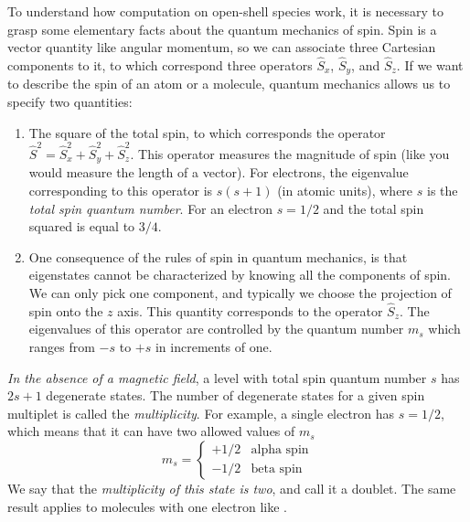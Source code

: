 \documentclass[../Main/notes.tex]{subfiles}
\begin{document}
To understand how computation on open-shell species work, it is necessary to grasp some elementary facts about the quantum mechanics of spin.
Spin is a vector quantity like angular momentum, so we can associate three Cartesian components to it, to which correspond three operators $\hat{S}_x$, $\hat{S}_y$, and $\hat{S}_z$.
If we want to describe the spin of an atom or a molecule, quantum mechanics allows us to specify two quantities:
\begin{enumerate}
\item The square of the total spin, to which corresponds the operator $\hat{S}^2 = \hat{S}_x^2 + \hat{S}_y^2 + \hat{S}_z^2$.
This operator measures the magnitude of spin (like you would measure the length of a vector).
For electrons, the eigenvalue corresponding to this operator is $s(s + 1)$ (in atomic units), where $s$ is the \emph{total spin quantum number}.
For an electron $s = 1/2$ and the total spin squared is equal to $3/4$.

\item One consequence of the rules of spin in quantum mechanics, is that eigenstates cannot be characterized by knowing all the components of spin.
We can only pick one component, and typically we choose the projection of spin onto the $z$ axis. This quantity corresponds to the operator $\hat{S}_z$.
The eigenvalues of this operator are controlled by the quantum number $m_s$ which ranges from $-s$ to $+s$ in increments of one.
\end{enumerate}
\emph{In the absence of a magnetic field}, a level with total spin quantum number $s$ has $2s + 1$ degenerate states. The number of degenerate states for a given spin multiplet is called the \emph{multiplicity}.
For example, a single electron has $s = 1/2$, which means that it can have two allowed values of $m_s$
\begin{equation}
m_s = \begin{cases}
+1/2 & \text{alpha spin} \\
-1/2 & \text{beta spin}
\end{cases}
\end{equation}
We say that the \emph{multiplicity of this state is two}, and call it a doublet.
The same result applies to molecules with one electron like .
\end{document}
